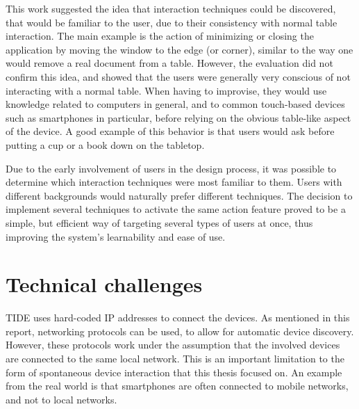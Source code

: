 This work suggested the idea that interaction techniques could be discovered, that would be familiar to the user, due to their consistency with normal table interaction.
The main example is the action of minimizing or closing the application by moving the window to the edge (or corner), similar to the way one would remove a real document from a table.
However, the evaluation did not confirm this idea, and showed that the users were generally very conscious of not interacting with a normal table.
When having to improvise, they would use knowledge related to computers in general, and to common touch-based devices such as smartphones in particular, before relying on the obvious table-like aspect of the device.
A good example of this behavior is that users would ask before putting a cup or a book down on the tabletop.



Due to the early involvement of users in the design process, it was possible to determine which interaction techniques were most familiar to them.
Users with different backgrounds would naturally prefer different techniques.
The decision to implement several techniques to activate the same action feature proved to be a simple, but efficient way of targeting several types of users at once, thus improving the system's learnability and ease of use.

\section{Technical challenges}
\label{disc:technical}

TIDE uses hard-coded IP addresses to connect the devices.
As mentioned in this report, networking protocols can be used, to allow for automatic device discovery.
However, these protocols work under the assumption that the involved devices are connected to the same local network.
This is an important limitation to the form of spontaneous device interaction that this thesis focused on.
An example from the real world is that smartphones are often connected to mobile networks, and not to local networks.

